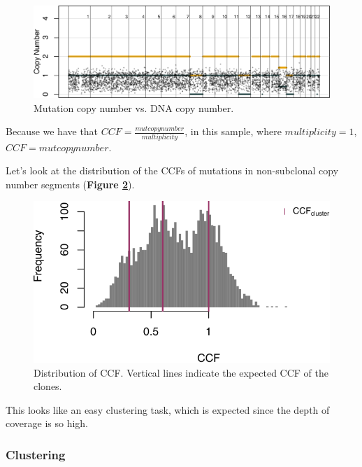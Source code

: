 \documentclass[]{article}
\begin{document}
\begin{figure}

{\centering \includegraphics{src_guide_files/figure-latex/fig7-1} 

}

\caption{\label{fig7} Mutation copy number vs. DNA copy number.}\label{fig:fig7}
\end{figure}

Because we have that \(CCF=\frac{mutcopynumber}{multiplicity}\), in this
sample, where \(multiplicity=1\), \(CCF=mutcopynumber\).

Let's look at the distribution of the CCFs of mutations in non-subclonal
copy number segments (\textbf{Figure \ref{fig:fig8}}).

\begin{figure}

{\centering \includegraphics{src_guide_files/figure-latex/fig8-1} 

}

\caption{\label{fig8} Distribution of CCF. Vertical lines indicate the expected CCF of the clones.}\label{fig:fig8}
\end{figure}

This looks like an easy clustering task, which is expected since the
depth of coverage is so high.

\hypertarget{clustering}{%
\subsubsection{Clustering}\label{clustering}}
\end{document}

